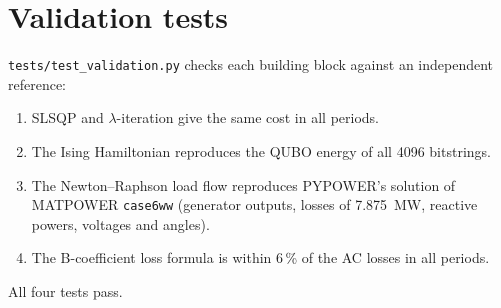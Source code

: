 \section{Validation tests}
\texttt{tests/test\_validation.py} checks each building block against an independent reference:
\begin{enumerate}
\item SLSQP and $\lambda$-iteration give the same cost in all periods.
\item The Ising Hamiltonian reproduces the QUBO energy of all 4096 bitstrings.
\item The Newton--Raphson load flow reproduces PYPOWER's solution of MATPOWER \texttt{case6ww} (generator outputs, losses of 7.875~MW, reactive powers, voltages and angles).
\item The B-coefficient loss formula is within 6\,\% of the AC losses in all periods.
\end{enumerate}
All four tests pass.

